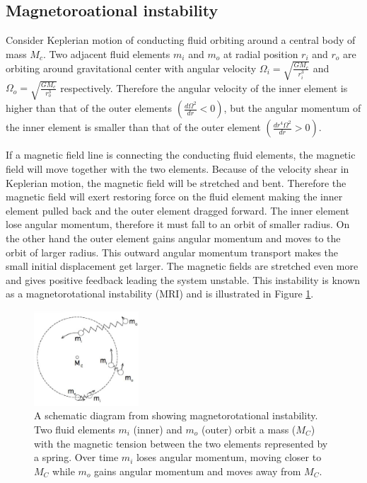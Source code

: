 \documentclass{jfm}
\begin{document}
%
%
\subsection{Magnetoroational instability}
Consider Keplerian motion of conducting fluid orbiting around a central body of mass $M_c$.
Two adjacent fluid elements $m_i$ and $m_o$ at radial position $r_i$ and $r_o$ are orbiting around gravitational center with angular velocity $\Omega_i=\sqrt{\frac{GM_c}{r_i^{3}}}$ and $\Omega_o=\sqrt{\frac{GM_c}{r_o^{3}}}$ respectively. Therefore the angular velocity of the inner element is higher than that of the outer elements $\left(\frac{d \Omega^2}{dr}<0\right)$, but the angular momentum of the inner element is smaller than that of the outer element $\left(\frac{d r^4\Omega^2}{dr}>0\right)$.

If a magnetic field line is connecting the conducting fluid elements, the magnetic field will move together with the two elements. Because of the velocity shear in Keplerian motion, the magnetic field will be stretched and bent. Therefore the magnetic field will exert restoring force on the fluid element making the inner element pulled back and the outer element dragged forward. The inner element lose angular momentum, therefore it must fall to an orbit of smaller radius. On the other hand the outer element gains angular momentum and moves to the orbit of larger radius. This outward angular momentum transport makes the small initial displacement get larger. The magnetic fields are stretched even more and gives positive feedback leading the system unstable. This instability is known as a magnetorotational instability (MRI) and is illustrated in Figure \ref{fig:mri}.

\begin{figure}[t]
    \centering
    \includegraphics[width=0.35\textwidth]{Balbus2009_diagram}
        \caption{A schematic diagram from \cite{Balbus2009} showing magnetorotational instability. Two fluid elements $m_i$ (inner) and $m_o$ (outer) orbit a mass ($M_C$) with the magnetic tension between the two elements represented by a spring. Over time $m_i$ loses angular momentum, moving closer to $M_C$ while $m_o$ gains angular momentum and moves away from $M_C$.}
        \label{fig:mri}
\end{figure}
\end{document}
